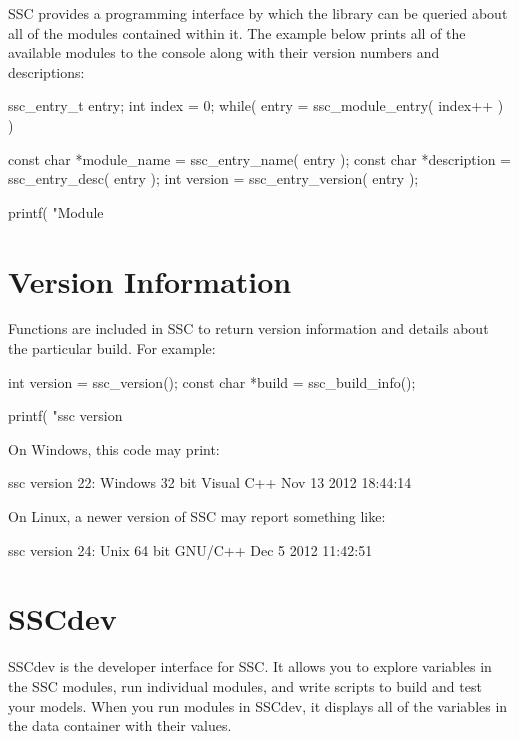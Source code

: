 \documentclass{article}
\begin{document}
SSC provides a programming interface by which the library can be queried about all of the modules contained within it.  The example below prints all of the available modules to the console along with their version numbers and descriptions:

\begin{verbatimtab}[4]
ssc_entry_t entry;
int index = 0;
while( entry = ssc_module_entry( index++ ) )
{
	const char *module_name = ssc_entry_name( entry );
	const char *description = ssc_entry_desc( entry );
	int version = ssc_entry_version( entry );

	printf( "Module %
}
\end{verbatimtab}

\section{Version Information}

Functions are included in SSC to return version information and details about the particular build.  For example:

\begin{verbatimtab}[4]
int version = ssc_version();
const char *build = ssc_build_info();

printf( "ssc version %
\end{verbatimtab}

On Windows, this code may print:

\begin{verbatimtab}[4]
	ssc version 22: Windows 32 bit Visual C++ Nov 13 2012 18:44:14
\end{verbatimtab}

On Linux, a newer version of SSC may report something like:
\begin{verbatimtab}[4]
	ssc version 24: Unix 64 bit GNU/C++ Dec  5 2012 11:42:51
\end{verbatimtab}

\section{SSCdev}
\label{sec_sscdev}

SSCdev is the developer interface for SSC. It allows you to explore variables in the SSC modules, run individual modules, and write scripts to build and test your models. When you run modules in SSCdev, it displays all of the variables in the data container with their values.
\end{document}
